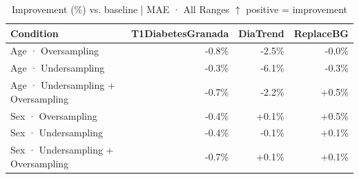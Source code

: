 \begin{table}[htbp]
\centering
\small
\caption{Improvement (\%) vs. baseline  |  MAE · All Ranges  $\uparrow$ positive = improvement}
\label{tab:delta_mae_entire_family_mechanism_random}
\begin{tabular}{lrrr}
\toprule
\textbf{Condition} & \textbf{T1DiabetesGranada} & \textbf{DiaTrend} & \textbf{ReplaceBG} \\
\midrule
Age · Oversampling & \textcolor{BrickRed}{-0.8\%} & \textcolor{BrickRed}{-2.5\%} & \textcolor{BrickRed}{-0.0\%} \\
Age · Undersampling & \textcolor{BrickRed}{-0.3\%} & \textcolor{BrickRed}{-6.1\%} & \textcolor{BrickRed}{-0.3\%} \\
Age · Undersampling + Oversampling & \textcolor{BrickRed}{-0.7\%} & \textcolor{BrickRed}{-2.2\%} & \textcolor{OliveGreen}{+0.5\%} \\
\midrule
Sex · Oversampling & \textcolor{BrickRed}{-0.4\%} & \textcolor{OliveGreen}{+0.1\%} & \textcolor{OliveGreen}{+0.5\%} \\
Sex · Undersampling & \textcolor{BrickRed}{-0.4\%} & \textcolor{BrickRed}{-0.1\%} & \textcolor{OliveGreen}{+0.1\%} \\
Sex · Undersampling + Oversampling & \textcolor{BrickRed}{-0.7\%} & \textcolor{OliveGreen}{+0.1\%} & \textcolor{OliveGreen}{+0.1\%} \\
\bottomrule
\end{tabular}
\end{table}